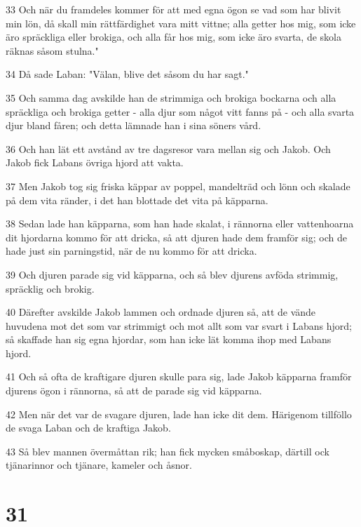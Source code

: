 \par 33 Och när du framdeles kommer för att med egna ögon se vad som har blivit min lön, då skall min rättfärdighet vara mitt vittne; alla getter hos mig, som icke äro spräckliga eller brokiga, och alla får hos mig, som icke äro svarta, de skola räknas såsom stulna."
\par 34 Då sade Laban: "Välan, blive det såsom du har sagt."
\par 35 Och samma dag avskilde han de strimmiga och brokiga bockarna och alla spräckliga och brokiga getter - alla djur som något vitt fanns på - och alla svarta djur bland fåren; och detta lämnade han i sina söners vård.
\par 36 Och han lät ett avstånd av tre dagsresor vara mellan sig och Jakob. Och Jakob fick Labans övriga hjord att vakta.
\par 37 Men Jakob tog sig friska käppar av poppel, mandelträd och lönn och skalade på dem vita ränder, i det han blottade det vita på käpparna.
\par 38 Sedan lade han käpparna, som han hade skalat, i rännorna eller vattenhoarna dit hjordarna kommo för att dricka, så att djuren hade dem framför sig; och de hade just sin parningstid, när de nu kommo för att dricka.
\par 39 Och djuren parade sig vid käpparna, och så blev djurens avföda strimmig, spräcklig och brokig.
\par 40 Därefter avskilde Jakob lammen och ordnade djuren så, att de vände huvudena mot det som var strimmigt och mot allt som var svart i Labans hjord; så skaffade han sig egna hjordar, som han icke lät komma ihop med Labans hjord.
\par 41 Och så ofta de kraftigare djuren skulle para sig, lade Jakob käpparna framför djurens ögon i rännorna, så att de parade sig vid käpparna.
\par 42 Men när det var de svagare djuren, lade han icke dit dem. Härigenom tillföllo de svaga Laban och de kraftiga Jakob.
\par 43 Så blev mannen övermåttan rik; han fick mycken småboskap, därtill ock tjänarinnor och tjänare, kameler och åsnor.

\chapter{31}

